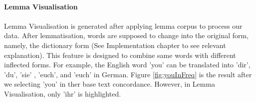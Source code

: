 \paragraph{Lemma Visualisation}
\paragraph[]{}Lemma Visualisation is generated after applying lemma corpus to process our data. After lemmatisation, words are supposed to change into the original form, namely, the dictionary form (See Implementation chapter to see relevant explanation). This feature is designed to combine same words with different inflected forms.
 For example, the English word 'you' can be translated into 'dir', 'du', 'sie' , 'euch', and 'euch' in German. Figure \ref{fig:youInFreq} is the result after we selecting 'you' in ther base text concordance. However, in Lemma Visualisation, only 'ihr' is highlighted.
 
